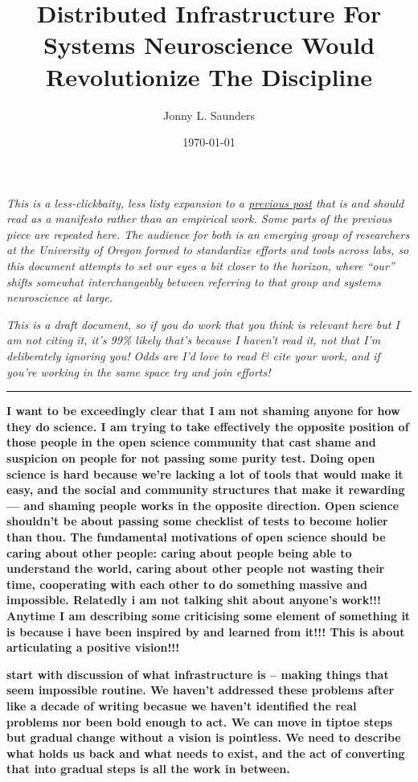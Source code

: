 \documentclass[nohyper]{tufte-book-jls}
\title{Distributed Infrastructure For Systems Neuroscience Would Revolutionize The Discipline}
\author{Jonny L. Saunders}
\date{\today}{}
\begin{document}
\frontmatter


\emph{This is a less-clickbaity, less listy expansion to a
\href{https://jon-e.net/blog/2021-03-01-Systems-Neuro-Infrastructure}{previous post} that
is and should read as a manifesto rather than an empirical work. Some
parts of the previous piece are repeated here. The audience for both is
an emerging group of researchers at the University of Oregon formed to
standardize efforts and tools across labs, so this document attempts to
set our eyes a bit closer to the horizon, where ``our'' shifts somewhat
interchangeably between referring to that group and systems neuroscience
at large.}

\emph{This is a draft document, so if you do work that you think is
relevant here but I am not citing it, it's 99\% likely that's because I
haven't read it, not that I'm deliberately ignoring you! Odds are I'd
love to read \& cite your work, and if you're working in the same space
try and join efforts!}

\begin{center}\rule{0.5\linewidth}{0.5pt}\end{center}

\textbf{I want to be exceedingly clear that I am not shaming anyone for
how they do science. I am trying to take effectively the opposite
position of those people in the open science community that cast shame
and suspicion on people for not passing some purity test. Doing open
science is hard because we're lacking a lot of tools that would make it
easy, and the social and community structures that make it rewarding ---
and shaming people works in the opposite direction. Open science
shouldn't be about passing some checklist of tests to become holier than
thou. The fundamental motivations of open science should be caring about
other people: caring about people being able to understand the world,
caring about other people not wasting their time, cooperating with each
other to do something massive and impossible. Relatedly i am not talking
shit about anyone's work!!! Anytime I am describing some criticising
some element of something it is because i have been inspired by and
learned from it!!! This is about articulating a positive vision!!!}

\textbf{start with discussion of what infrastructure is -- making things
that seem impossible routine. We haven't addressed these problems after
like a decade of writing becasue we haven't identified the real problems
nor been bold enough to act. We can move in tiptoe steps but gradual
change without a vision is pointless. We need to describe what holds us
back and what needs to exist, and the act of converting that into
gradual steps is all the work in between.}
\end{document}
